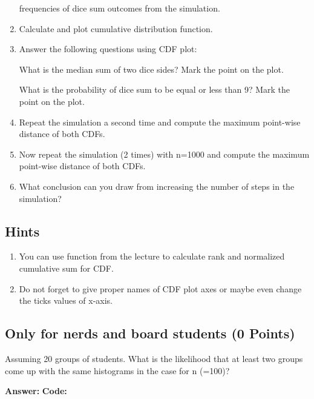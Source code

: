 \documentclass{WeSTassignment}
\begin{document}
\begin{enumerate}
frequencies of dice sum outcomes from the simulation. 
\item Calculate and plot cumulative distribution function.
\item Answer the following questions using CDF plot:

What is the median sum of two dice sides?  Mark the point on the plot.

What is the probability of dice sum to be equal or less than 9? Mark the point on the plot.

\item Repeat the simulation a second time and compute the maximum point-wise distance of both CDFs.
\item Now repeat the simulation (2 times) with n=1000 and compute the maximum point-wise distance of both CDFs.
\item What conclusion can you draw from increasing the number of steps in the simulation?  

\end{enumerate}


\subsection{Hints}
\begin{enumerate}
\item You can use function from the lecture to calculate rank and normalized cumulative sum for CDF.
\item Do not forget to give proper names of CDF plot axes or maybe even change the ticks values of x-axis. 
\end{enumerate}

\subsection{Only for nerds and board students (0 Points)}
Assuming 20 groups of students. What is the likelihood that at least two groups come up with the same histograms in the case for n (=100)?


\textbf{Answer:}
\textbf{Code:}

\end{document}
